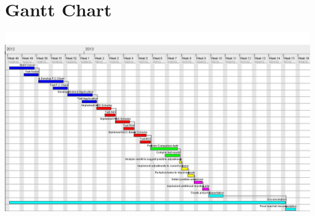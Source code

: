 \documentclass[a4paper,10pt]{report}
\begin{document}
\appendix
\chapter{Gantt Chart}\label{A}
\includegraphics[scale=0.35, angle=270]{images/ProgReportChart.jpg}


\end{document}
